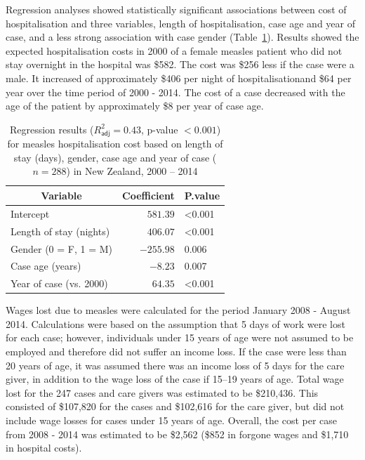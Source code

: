\documentclass{article}
\begin{document}
Regression analyses showed statistically significant associations between cost of hospitalisation and three variables, length of hospitalisation, case age and year of case, and a less strong association with case gender (Table~\ref{table:regression}). Results showed the expected hospitalisation costs in 2000 of a female measles patient who did not stay overnight in the hospital was \$582.  The cost was \$256 less if the case were a male. It increased of approximately \$406 per night of hospitalisationand \$64 per year over the time period of 2000 - 2014. The cost of a case decreased with the age of the patient by approximately \$8 per year of case age.


\begin{table}
\caption{Regression results ($R^{2}_\textsf{adj} = 0.43$, p-value $<0.001$) for measles hospitalisation cost based on length of stay (days), gender, case age and year of case ($n=288$) in New Zealand, 2000 -- 2014}
\begin{center}
\begin{tabular}{lrl}
\hline\hline
\multicolumn{1}{c}{Variable}&\multicolumn{1}{c}{Coefficient}&\multicolumn{1}{c}{P.value}\tabularnewline
\hline
Intercept&$ 581.39$&\textless  0.001\tabularnewline
Length of stay (nights)&$ 406.07$&\textless  0.001\tabularnewline
Gender (0 = F, 1 = M)&$-255.98$&0.006\tabularnewline
Case age (years)&$  -8.23$&0.007\tabularnewline
Year of case (vs. 2000)&$  64.35$&\textless  0.001\tabularnewline
\hline
\end{tabular}\end{center}\label{table:regression}
\end{table}

Wages lost due to measles were calculated for the period January 2008 - August 2014. Calculations were based on the assumption that 5 days of work were lost for each case; however, individuals under 15 years of age were not assumed to be employed and therefore did not suffer an income loss. If the case were less than 20 years of age, it was assumed there was an income loss of 5 days for the care giver, in addition to the wage loss of the case if 15--19 years of age. Total wage lost for the 247 cases and care givers was estimated to be \$210,436. This consisted of \$107,820 for the cases and \$102,616 for the care giver, but did not include wage losses for cases under 15 years of age. Overall, the cost per case from 2008 - 2014 was estimated to be \$2,562 (\$852 in forgone wages and \$1,710 in hospital costs).
\end{document}
